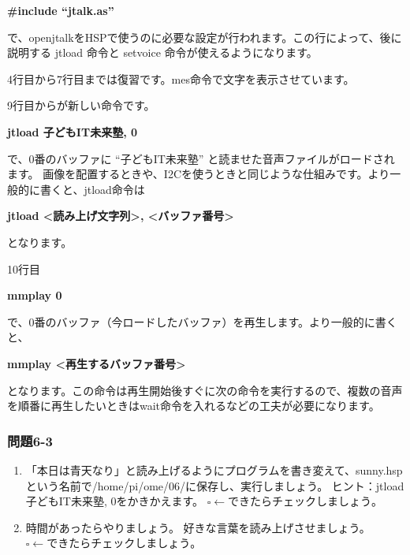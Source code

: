 \documentclass[a4paper,dvipdfmx]{jarticle}
\newcommand\liststyleLiv{%
\renewcommand\theenumi{\arabic{enumi}}
\renewcommand\theenumii{\arabic{enumii}}
\renewcommand\theenumiii{\arabic{enumiii}}
\renewcommand\theenumiv{\arabic{enumiv}}
\renewcommand\labelenumi{\theenumi.}
\renewcommand\labelenumii{\theenumii.}
\renewcommand\labelenumiii{\theenumiii.}
\renewcommand\labelenumiv{\theenumiv.}
}
\begin{document}
{\ttfamily\bfseries
\#include ``jtalk.as''}

{
で、openjtalkをHSPで使うのに必要な設定が行われます。この行によって、後に説明する
jtload 命令と setvoice
命令が使えるようになります。}

{
4行目から7行目までは復習です。mes命令で文字を表示させています。}

{
9行目からが新しい命令です。}

{\ttfamily\bfseries
jtload {\textquotedbl}子どもIT未来塾{\textquotedbl}, 0}

{
で、0番のバッファに ``子どもIT未来塾''
と読ませた音声ファイルがロードされます。
画像を配置するときや、I2Cを使うときと同じような仕組みです。より一般的に書くと、jtload命令は}

{\ttfamily\bfseries
jtload {\textless}読み上げ文字列{\textgreater},
{\textless}バッファ番号{\textgreater}}

{
となります。}

{
10行目}

{\ttfamily\bfseries
mmplay 0}

{
で、0番のバッファ（今ロードしたバッファ）を再生します。より一般的に書くと、}

{\ttfamily\bfseries
mmplay {\textless}再生するバッファ番号{\textgreater}}

{
となります。この命令は再生開始後すぐに次の命令を実行するので、複数の音声を順番に再生したいときはwait命令を入れるなどの工夫が必要になります。}


\bigskip

\subsubsection{問題6-3}
\liststyleLiv
\begin{enumerate}
\item {
「本日は青天なり」と読み上げるようにプログラムを書き変えて、sunny.hspという名前で/home/pi/ome/06/に保存し、実行しましょう。\newline
ヒント：jtload {\textquotedbl}子どもIT未来塾{\textquotedbl},
0をかきかえます。\newline
${\square}\leftarrow
できたらチェックしましょう。$}
\item {
時間があったらやりましょう。\newline
好きな言葉を読み上げさせましょう。\newline
${\square}\leftarrow
できたらチェックしましょう。$}
\end{enumerate}
\end{document}
